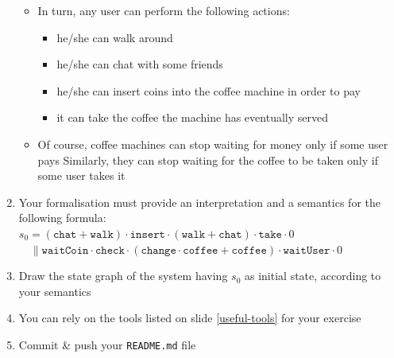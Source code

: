 \documentclass[presentation]{beamer}\mode<presentation>{\usetheme{AMSCesenaPurpleAndGold}}
\begin{document}
\begin{frame}[allowframebreaks]
\begin{enumerate}
\begin{itemize}
            \medskip
            
            \item In turn, any user can perform the following actions:
            \begin{itemize}
                \item he/she can \alert{walk} around
                \item he/she can \alert{chat} with some friends
                \item he/she can insert coins into the coffee machine in order to \alert{pay}
                \item it can \alert{take} the coffee the machine has eventually served
            \end{itemize}

            \medskip
            
            \item Of course, coffee machines can stop waiting for money only if some user pays 
            Similarly, they can stop waiting for the coffee to be taken only if some user takes it
        \end{itemize}

        \bigskip
        
        \item Your formalisation must provide an interpretation and a semantics for the following formula:
        \\\vspace{.1cm}
        \alert{$
            s_0 = (\mathtt{chat} + \mathtt{walk}) \cdot \mathtt{insert} \cdot (\mathtt{walk} + \mathtt{chat}) \cdot \mathtt{take} \cdot 0
        $\\\hfill$    
            \quad\parallel
            \mathtt{waitCoin} \cdot \mathtt{check} \cdot (\mathtt{change} \cdot \mathtt{coffee} + \mathtt{coffee}) \cdot \mathtt{waitUser} \cdot 0
        $}

        \bigskip
        
        \item Draw the state graph of the system having $s_0$ as initial state, according to your semantics
        
        \bigskip
        
        \item You can rely on the tools listed on slide \ref{useful-tools} for your exercise
        
        \bigskip
        
        \item Commit \& push your \texttt{README.md} file
        
    \end{enumerate}
    

\end{frame}
\end{document}
